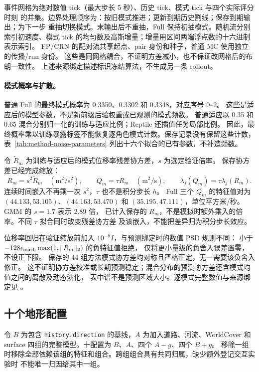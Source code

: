 \documentclass[UTF8,11pt]{ctexart}
\begin{document}
事件网格为绝对数值 tick（最大步长 5 秒）、历史 tick、模式 tick 与四个实际评分时刻
的并集。边界处理顺序为：按旧模式推进；更新到期历史割线；保存到期输出；为下一步
重抽切换模式。末输出后不重抽，Full 保持初抽模式。随机流分别索引初速度、模式 tick
的均匀数及高斯增量；增量用区间两端浮点数的十六进制表示索引。
FP/CRN 的配对流共享起点、pair 身份和种子，普通 MC 使用独立的传播/run 身份。
这些是同网格耦合，不证明方差减小，也不保证改网格后的布朗一致性。
上述来源绑定描述标识冻结算法，不生成另一条 rollout。

\paragraph{模式概率与扩散。}
普通 Full 的最终模式概率为 0.3350、0.3302 和 0.3348，对应序号 0--2。
这些是适应后的模型参数，不是新前缀后验权重或已观测的模式频数。
普通适应以 0.35 和 0.65 混合分别归一化的训练与适应比例；Reptile 还插值任务局部比例。
因此，最终概率乘以训练暴露标签不能恢复逐角色模式计数。保存记录没有保留这些计数，
表~\ref{tab:method-noise-parameters} 列出十六个拟合的已有参数，不补造频数。

令 $\widetilde R_m$ 为训练与适应后的模式位移率残差协方差，$s$ 为选定验证倍率。
保存协方差已经完成缩放：
\begin{equation}
R_m=s^2\widetilde R_m\quad(\mathrm{m}^2/\mathrm{s}^2),\qquad
Q_m=\tau R_m\quad(\mathrm{m}^2/\mathrm{s}),\qquad
\lambda_j(Q_m)=\tau\lambda_j(R_m).
\label{eq:saved-method-noise}
\end{equation}
连续时间嵌入不再乘一次 $s^2$，$\tau$ 也不是积分步长 $h$。
Full 三个 $Q_m$ 的特征值对为 $(44.133,53.105)$、$(44.163,53.470)$ 和
$(35.195,47.111)$，单位平方米/秒。GMM 的 $s=1.7$ 表示 2.89 倍，
已计入保存的 $R_m$，不是模拟时额外乘入的倍率。不同 $\tau$ 拟合同时改变残差协方差
及该嵌入，不能把差异归为积分步长效应。

位移率回归在验证缩放前加入 $10^{-8}I$，与预测绑定时的数值 PSD 规则不同：
小于 $-128\epsilon_{\rm mach}\max(1,\|R_m\|_2)$ 的负特征值拒绝，
仅将更小量级的负舍入误差置零，不设正下限。
保存的 44 组方法模式协方差均对称且严格正定，无一需要该负舍入修正。
这不证明协方差校准或长期预测稳定；混合分布的预测协方差还含模式均值之间的离散及动态演化，
表中谱不是预测区域大小。逐模式完整数值与来源绑定见
。

\subsection{十个地形配置}
令 \(B\) 为包含 \texttt{history.direction} 的基线，\(A\) 为加入道路、河流、WorldCover
和 surface 四组的完整模型。十配置为 \(B\)、\(A\)、四个 \(A-g\)、四个 \(B+g\)。
移除一组时移除全部依赖该组的特征和组合。跨组组合具有共同归属，缺少额外登记交互实验时
不能唯一归因给其中一组。
\end{document}
